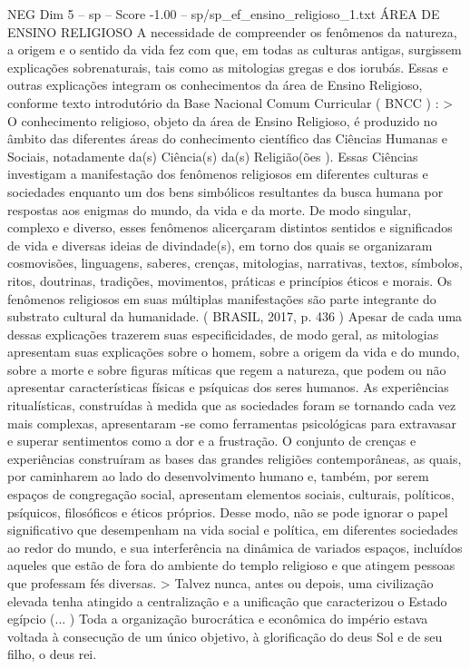\begin{textsample}{NEG Dim 5 – sp – Score -1.00 – sp/sp\_ef\_ensino\_religioso\_1.txt}  \label{ex:f5_neg_211}
ÁREA DE ENSINO RELIGIOSO A necessidade de compreender os fenômenos da natureza, a origem e o sentido da vida fez com que, em todas as culturas antigas, surgissem explicações sobrenaturais, tais como as mitologias gregas e dos iorubás.
Essas e outras explicações integram os conhecimentos da área de Ensino Religioso, conforme texto introdutório da Base Nacional Comum Curricular ( BNCC ) : > O conhecimento religioso, objeto da área de Ensino Religioso, é produzido no âmbito das diferentes áreas do conhecimento científico das Ciências Humanas e Sociais, notadamente da(s) Ciência(s) da(s) Religião(ões ).
Essas Ciências investigam a manifestação dos fenômenos religiosos em diferentes culturas e sociedades enquanto um dos bens simbólicos resultantes da busca humana por respostas aos enigmas do mundo, da vida e da morte.
De modo singular, complexo e diverso, esses fenômenos alicerçaram distintos sentidos e significados de vida e diversas ideias de divindade(s), em torno dos quais se organizaram cosmovisões, linguagens, saberes, crenças, mitologias, narrativas, textos, símbolos, ritos, doutrinas, tradições, movimentos, práticas e princípios éticos e morais.
Os fenômenos religiosos em suas múltiplas manifestações são parte integrante do substrato cultural da humanidade. ( BRASIL, 2017, p. 436 ) Apesar de cada uma dessas explicações trazerem suas especificidades, de modo geral, as mitologias apresentam suas explicações sobre o homem, sobre a origem da vida e do mundo, sobre a morte e sobre figuras míticas que regem a natureza, que podem ou não apresentar características físicas e psíquicas dos seres humanos.
As experiências ritualísticas, construídas à medida que as sociedades foram se tornando cada vez mais complexas, apresentaram -se como ferramentas psicológicas para extravasar e superar sentimentos como a dor e a frustração.
O conjunto de crenças e experiências construíram as bases das grandes religiões contemporâneas, as quais, por caminharem ao lado do desenvolvimento humano e, também, por serem espaços de congregação social, apresentam elementos sociais, culturais, políticos, psíquicos, filosóficos e éticos próprios.
Desse modo, não se pode ignorar o papel significativo que desempenham na vida social e política, em diferentes sociedades ao redor do mundo, e sua interferência na dinâmica de variados espaços, incluídos aqueles que estão de fora do ambiente do templo religioso e que atingem pessoas que professam fés diversas. > Talvez nunca, antes ou depois, uma civilização elevada tenha atingido a centralização e a unificação que caracterizou o Estado egípcio (... ) Toda a organização burocrática e econômica do império estava voltada à consecução de um único objetivo, à glorificação do deus Sol e de seu filho, o deus rei.

\end{textsample}
